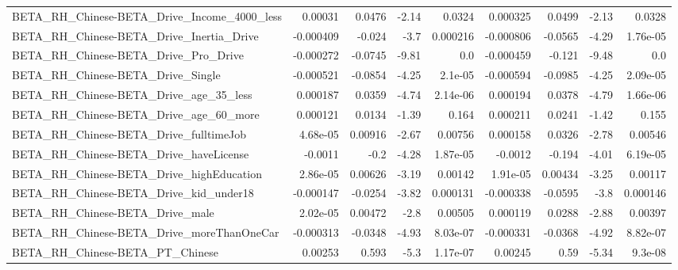 \begin{tabular}{lrrrrrrrr}
BETA\_RH\_Chinese-BETA\_Drive\_Income\_4000\_less        &     0.00031 &       0.0476 &    -2.14 &   0.0324 &   0.000325 &      0.0499 &        -2.13 &        0.0328 \\
BETA\_RH\_Chinese-BETA\_Drive\_Inertia\_Drive           &   -0.000409 &       -0.024 &     -3.7 & 0.000216 &  -0.000806 &     -0.0565 &        -4.29 &      1.76e-05 \\
BETA\_RH\_Chinese-BETA\_Drive\_Pro\_Drive               &   -0.000272 &      -0.0745 &    -9.81 &      0.0 &  -0.000459 &      -0.121 &        -9.48 &           0.0 \\
BETA\_RH\_Chinese-BETA\_Drive\_Single                  &   -0.000521 &      -0.0854 &    -4.25 &  2.1e-05 &  -0.000594 &     -0.0985 &        -4.25 &      2.09e-05 \\
BETA\_RH\_Chinese-BETA\_Drive\_age\_35\_less             &    0.000187 &       0.0359 &    -4.74 & 2.14e-06 &   0.000194 &      0.0378 &        -4.79 &      1.66e-06 \\
BETA\_RH\_Chinese-BETA\_Drive\_age\_60\_more             &    0.000121 &       0.0134 &    -1.39 &    0.164 &   0.000211 &      0.0241 &        -1.42 &         0.155 \\
BETA\_RH\_Chinese-BETA\_Drive\_fulltimeJob             &    4.68e-05 &      0.00916 &    -2.67 &  0.00756 &   0.000158 &      0.0326 &        -2.78 &       0.00546 \\
BETA\_RH\_Chinese-BETA\_Drive\_haveLicense             &     -0.0011 &         -0.2 &    -4.28 & 1.87e-05 &    -0.0012 &      -0.194 &        -4.01 &      6.19e-05 \\
BETA\_RH\_Chinese-BETA\_Drive\_highEducation           &    2.86e-05 &      0.00626 &    -3.19 &  0.00142 &   1.91e-05 &     0.00434 &        -3.25 &       0.00117 \\
BETA\_RH\_Chinese-BETA\_Drive\_kid\_under18             &   -0.000147 &      -0.0254 &    -3.82 & 0.000131 &  -0.000338 &     -0.0595 &         -3.8 &      0.000146 \\
BETA\_RH\_Chinese-BETA\_Drive\_male                    &    2.02e-05 &      0.00472 &     -2.8 &  0.00505 &   0.000119 &      0.0288 &        -2.88 &       0.00397 \\
BETA\_RH\_Chinese-BETA\_Drive\_moreThanOneCar          &   -0.000313 &      -0.0348 &    -4.93 & 8.03e-07 &  -0.000331 &     -0.0368 &        -4.92 &      8.82e-07 \\
BETA\_RH\_Chinese-BETA\_PT\_Chinese                    &     0.00253 &        0.593 &     -5.3 & 1.17e-07 &    0.00245 &        0.59 &        -5.34 &       9.3e-08 \\

\end{tabular}
